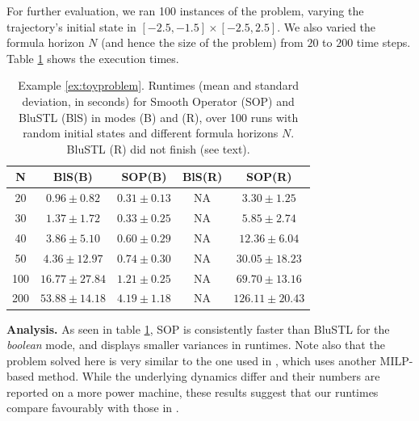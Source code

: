 \begin{exmp}
For further evaluation, we ran 100 instances of the problem, varying the trajectory's initial state in $[-2.5,-1.5] \times [-2.5,2.5]$. 
We also varied the formula horizon $N$ (and hence the size of the problem) from $20$ to $200$ time steps. 
Table \ref{tbl:time_performance_toy} shows the execution times. 



\begin{table}[tb]
\small
\begin{center}
\caption{{\small Example \ref{ex:toyproblem}. Runtimes (mean and standard deviation, in seconds) for Smooth Operator (SOP) and BluSTL (BlS) in modes (B) and (R), over 100 runs with random initial states and different formula horizons $N$. BluSTL (R) did not finish (see text).}}
\vspace{-5pt}
\label{tbl:time_performance_toy}
\begin{tabular} {|c|c|c|c|c|}
	\hline
	N & BlS(B) & SOP(B) & BlS(R) & SOP(R) \\ \hline
	20 & $0.96 \pm 0.82$ &  $\mathbf{0.31 \pm 0.13}$  & NA & $3.30 \pm 1.25$ \\ \hline
	30 & $1.37 \pm 1.72$ &  $\mathbf{0.33 \pm 0.25}$  & NA & $5.85 \pm 2.74$\\ \hline
	40 & $3.86 \pm 5.10$ &  $\mathbf{0.60 \pm 0.29}$  & NA & $12.36 \pm 6.04$\\ \hline
	50 & $4.36 \pm 12.97$&  $\mathbf{0.74 \pm 0.30}$ & NA & $30.05 \pm 18.23$\\ \hline
	100& $16.77 \pm 27.84$ & $\mathbf{1.21 \pm 0.25}$ & NA & $69.70 \pm 13.16$ \\ \hline
	200& $53.88 \pm 14.18$& $\mathbf{4.19 \pm 1.18}$ & NA & $126.11 \pm 20.43$ \\ \hline
\end{tabular}	
\end{center}
\end{table}

\textbf{Analysis.}
As seen in table \ref{tbl:time_performance_toy}, SOP is consistently faster than BluSTL for the \textit{boolean} mode, and displays smaller variances in runtimes. 
Note also that the problem solved here is very similar to the one used in \cite{Saha_acc16}, which uses another MILP-based method. 
While the underlying dynamics differ and their numbers are reported on a more power machine, these results suggest that our runtimes compare favourably with those in \cite{Saha_acc16}.


\end{exmp}
